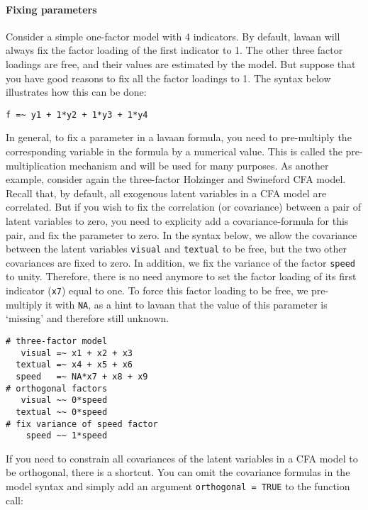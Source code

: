 \hypertarget{fixing-parameters}{%
\paragraph{Fixing parameters}\label{fixing-parameters}}

Consider a simple one-factor model with 4 indicators. By default, lavaan
will always fix the factor loading of the first indicator to 1. The
other three factor loadings are free, and their values are estimated by
the model. But suppose that you have good reasons to fix all the factor
loadings to 1. The syntax below illustrates how this can be done:

\begin{verbatim}
f =~ y1 + 1*y2 + 1*y3 + 1*y4
\end{verbatim}

In general, to fix a parameter in a lavaan formula, you need to
pre-multiply the corresponding variable in the formula by a numerical
value. This is called the pre-multiplication mechanism and will be used
for many purposes. As another example, consider again the three-factor
Holzinger and Swineford CFA model. Recall that, by default, all
exogenous latent variables in a CFA model are correlated. But if you
wish to fix the correlation (or covariance) between a pair of latent
variables to zero, you need to explicity add a covariance-formula for
this pair, and fix the parameter to zero. In the syntax below, we allow
the covariance between the latent variables \texttt{visual} and
\texttt{textual} to be free, but the two other covariances are fixed to
zero. In addition, we fix the variance of the factor \texttt{speed} to
unity. Therefore, there is no need anymore to set the factor loading of
its first indicator (\texttt{x7}) equal to one. To force this factor
loading to be free, we pre-multiply it with \texttt{NA}, as a hint to
lavaan that the value of this parameter is `missing' and therefore still
unknown.

\begin{verbatim}
# three-factor model
   visual =~ x1 + x2 + x3
  textual =~ x4 + x5 + x6
  speed   =~ NA*x7 + x8 + x9
# orthogonal factors
   visual ~~ 0*speed
  textual ~~ 0*speed
# fix variance of speed factor
    speed ~~ 1*speed
\end{verbatim}

If you need to constrain all covariances of the latent variables in a
CFA model to be orthogonal, there is a shortcut. You can omit the
covariance formulas in the model syntax and simply add an argument
\texttt{orthogonal\ =\ TRUE} to the function call:


